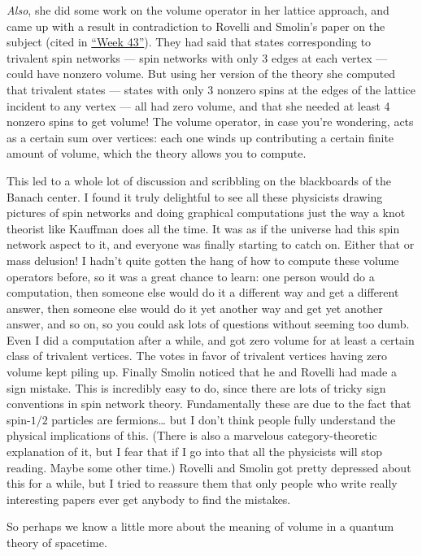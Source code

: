 \documentclass{article}
\begin{document}
\emph{Also}, she did some work on the volume operator in her lattice
approach, and came up with a result in contradiction to Rovelli and
Smolin's paper on the subject (cited in
\protect\hyperlink{week43}{``Week 43''}). They had said that states
corresponding to trivalent spin networks --- spin networks with only 3
edges at each vertex --- could have nonzero volume. But using her
version of the theory she computed that trivalent states --- states with
only 3 nonzero spins at the edges of the lattice incident to any vertex
--- all had zero volume, and that she needed at least 4 nonzero spins to
get volume! The volume operator, in case you're wondering, acts as a
certain sum over vertices: each one winds up contributing a certain
finite amount of volume, which the theory allows you to compute.

This led to a whole lot of discussion and scribbling on the blackboards
of the Banach center. I found it truly delightful to see all these
physicists drawing pictures of spin networks and doing graphical
computations just the way a knot theorist like Kauffman does all the
time. It was as if the universe had this spin network aspect to it, and
everyone was finally starting to catch on. Either that or mass delusion!
I hadn't quite gotten the hang of how to compute these volume operators
before, so it was a great chance to learn: one person would do a
computation, then someone else would do it a different way and get a
different answer, then someone else would do it yet another way and get
yet another answer, and so on, so you could ask lots of questions
without seeming too dumb. Even I did a computation after a while, and
got zero volume for at least a certain class of trivalent vertices. The
votes in favor of trivalent vertices having zero volume kept piling up.
Finally Smolin noticed that he and Rovelli had made a sign mistake. This
is incredibly easy to do, since there are lots of tricky sign
conventions in spin network theory. Fundamentally these are due to the
fact that spin-\(1/2\) particles are fermions\ldots{} but I don't think
people fully understand the physical implications of this. (There is
also a marvelous category-theoretic explanation of it, but I fear that
if I go into that all the physicists will stop reading. Maybe some other
time.) Rovelli and Smolin got pretty depressed about this for a while,
but I tried to reassure them that only people who write really
interesting papers ever get anybody to find the mistakes.

So perhaps we know a little more about the meaning of volume in a
quantum theory of spacetime.
\end{document}
